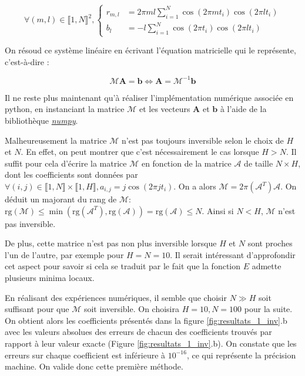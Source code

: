 \documentclass[12pt]{report}
\begin{document}
\begin{equation}
    \forall (m,l) \in \llbracket 1, N\rrbracket ^2,
    \left\{
    \begin{aligned}
        r_{m,l} & = 2\pi ml \sum_{i=1}^{N}\cos(2\pi mt_i)\cos(2\pi lt_i) \\
        b_l     & = -l\sum_{i=1}^{N}\cos(2\pi t_i)\cos(2\pi lt_i)
    \end{aligned}
    \right.
    \label{eq:definition_coefficients}
\end{equation}

On résoud ce système linéaire en écrivant l'équation matricielle qui le représente, c'est-à-dire :

\begin{equation}
    \mathcal{M} \bm{A} = \bm{b} \Leftrightarrow \bm{A} = \mathcal{M}^{-1}\bm{b}
    \label{eq:equation_matricielle}
\end{equation}

Il ne reste plus maintenant qu'à réaliser l'implémentation numérique associée en python, en instanciant la matrice ${\mathcal{M}}$ et les vecteurs $\bm{A}$ et $\bm{b}$ à l'aide de la bibliothèque \href{https://numpy.org}{\emph{numpy}}.

Malheureusement la matrice $\mathcal{M}$ n'est pas toujours inversible selon le choix de $H$ et $N$.
En effet, on peut montrer que c'est nécessairement le cas lorsque $H>N$. 
Il suffit pour cela d'écrire la matrice $\mathcal{M}$ en fonction de la matrice $\mathcal{A}$ de taille $N \times H$, dont les coefficients sont données par $ \forall (i,j) \in \llbracket 1, N\rrbracket \times \llbracket 1, H\rrbracket, a_{i,j} = j \cos(2 \pi j t_i)$.
On a alors $\mathcal{M} = 2\pi(\mathcal{A}^T)\mathcal{A}$. 
On déduit un majorant du rang de $\mathcal{M}$: $\mathrm{rg}(\mathcal{M}) \leq \min(\mathrm{rg}(\mathcal{A}^T), \mathrm{rg}(\mathcal{A})) = \mathrm{rg}(\mathcal{A}) \leq N $. 
Ainsi si $N<H$, $\mathcal{M}$ n'est pas inversible.

De plus, cette matrice n'est pas non plus inversible lorsque $H$ et $N$ sont proches l'un de l'autre, par exemple pour $H=N=10$.
Il serait intéressant d'approfondir cet aspect pour savoir si cela se traduit par le fait que la fonction $E$ admette plusieurs minima locaux.

En réalisant des expériences numériques, il semble que choisir $N\gg H$ soit suffisant pour que $\mathcal{M}$ soit inversible.
On choisira $H=10, N=100$ pour la suite.
On obtient alors les coefficients présentés dans la figure \ref{fig:resultats_1_inv}.b avec les valeurs absolues des erreurs de chacun des coefficients trouvés par rapport à leur valeur exacte (Figure \ref{fig:resultats_1_inv}.b).
On constate que les erreurs sur chaque coefficient est inférieure à $10^{-16}$, ce qui représente la précision machine.
On valide donc cette première méthode.
\end{document}
